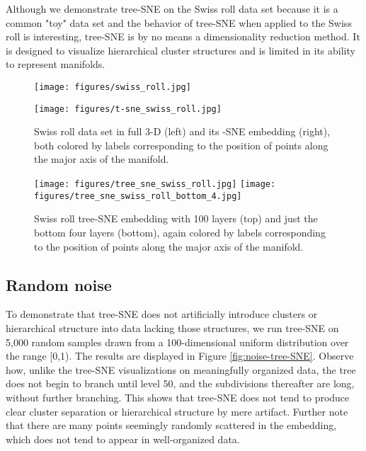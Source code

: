 \documentclass{article}
\begin{document}
Although we demonstrate tree-SNE on the Swiss roll data set because it is a common "toy" data set and the behavior of tree-SNE when applied to the Swiss roll is interesting, tree-SNE is by no means a dimensionality reduction method. It is designed to visualize hierarchical cluster structures and is limited in its ability to represent manifolds.  

\begin{figure}[htp]
    \centering
    \captionsetup{width=.9\linewidth}
    \begin{minipage}[b]{0.4\textwidth}
    \texttt{[image: figures/swiss\_roll.jpg]}
    \end{minipage}
    \begin{minipage}[b]{0.4\textwidth}
    \texttt{[image: figures/t-sne\_swiss\_roll.jpg]}
    \end{minipage}
    \caption{Swiss roll data set in full 3-D (left) and its -SNE embedding (right), both colored by labels corresponding to the position of points along the major axis of the manifold.}
    \label{fig:swiss-roll-t-SNE}
\end{figure}

\begin{figure}[H]
    \centering
    \captionsetup{width=.9\linewidth}
    \texttt{[image: figures/tree\_sne\_swiss\_roll.jpg]}
    \texttt{[image: figures/tree\_sne\_swiss\_roll\_bottom\_4.jpg]}
    \caption{Swiss roll tree-SNE embedding with 100 layers (top) and just the bottom four layers (bottom), again colored by labels corresponding to the position of points along the major axis of the manifold.}
    \label{fig:swiss-roll-tree-SNE}
\end{figure}

\subsection{Random noise} \label{sec:noise}

To demonstrate that tree-SNE does not artificially introduce clusters or hierarchical structure into data lacking those structures, we run tree-SNE on 5,000 random samples drawn from a 100-dimensional uniform distribution over the range [0,1). The results are displayed in Figure \ref{fig:noise-tree-SNE}. Observe how, unlike the tree-SNE visualizations on meaningfully organized data, the tree does not begin to branch until level 50, and the subdivisions thereafter are long, without further branching. This shows that tree-SNE does not tend to produce clear cluster separation or hierarchical structure by mere artifact. Further note that there are many points seemingly randomly scattered in the embedding, which does not tend to appear in well-organized data.
\end{document}
